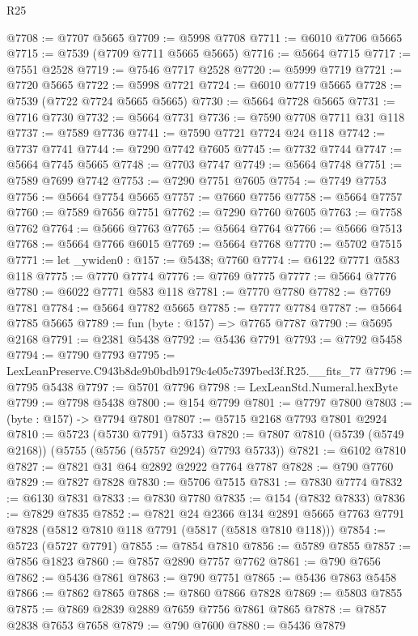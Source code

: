 \begin{lexlean}{R25}
\begin{coremodule}
@7708 := @7707 @5665
@7709 := @5998 @7708
@7711 := @6010 @7706 @5665
@7715 := @7539 (@7709 @7711 @5665 @5665)
@7716 := @5664 @7715
@7717 := @7551 @2528
@7719 := @7546 @7717 @2528
@7720 := @5999 @7719
@7721 := @7720 @5665
@7722 := @5998 @7721
@7724 := @6010 @7719 @5665
@7728 := @7539 (@7722 @7724 @5665 @5665)
@7730 := @5664 @7728 @5665
@7731 := @7716 @7730
@7732 := @5664 @7731
@7736 := @7590 @7708 @7711 @31 @118
@7737 := @7589 @7736
@7741 := @7590 @7721 @7724 @24 @118
@7742 := @7737 @7741
@7744 := @7290 @7742 @7605
@7745 := @7732 @7744
@7747 := @5664 @7745 @5665
@7748 := @7703 @7747
@7749 := @5664 @7748
@7751 := @7589 @7699 @7742
@7753 := @7290 @7751 @7605
@7754 := @7749 @7753
@7756 := @5664 @7754 @5665
@7757 := @7660 @7756
@7758 := @5664 @7757
@7760 := @7589 @7656 @7751
@7762 := @7290 @7760 @7605
@7763 := @7758 @7762
@7764 := @5666 @7763
@7765 := @5664 @7764
@7766 := @5666 @7513
@7768 := @5664 @7766 @6015
@7769 := @5664 @7768
@7770 := @5702 @7515
@7771 := let _ywiden0 : @157 := @5438; @7760
@7774 := @6122 @7771 @583 @118
@7775 := @7770 @7774
@7776 := @7769 @7775
@7777 := @5664 @7776
@7780 := @6022 @7771 @583 @118
@7781 := @7770 @7780
@7782 := @7769 @7781
@7784 := @5664 @7782 @5665
@7785 := @7777 @7784
@7787 := @5664 @7785 @5665
@7789 := fun (byte : @157) => @7765 @7787
@7790 := @5695 @2168
@7791 := @2381 @5438
@7792 := @5436 @7791
@7793 := @7792 @5458
@7794 := @7790 @7793
@7795 := LexLeanPreserve.C943b8de9b0bdb9179c4e05c7397bed3f.R25.__fits_77
@7796 := @7795 @5438
@7797 := @5701 @7796
@7798 := LexLeanStd.Numeral.hexByte
@7799 := @7798 @5438
@7800 := @154 @7799
@7801 := @7797 @7800
@7803 := (byte : @157) -> @7794 @7801
@7807 := @5715 @2168 @7793 @7801 @2924
@7810 := @5723 (@5730 @7791) @5733
@7820 := @7807 @7810 (@5739 (@5749 @2168)) (@5755 (@5756 (@5757 @2924) @7793 @5733))
@7821 := @6102 @7810
@7827 := @7821 @31 @64 @2892 @2922 @7764 @7787
@7828 := @790 @7760
@7829 := @7827 @7828
@7830 := @5706 @7515
@7831 := @7830 @7774
@7832 := @6130 @7831
@7833 := @7830 @7780
@7835 := @154 (@7832 @7833)
@7836 := @7829 @7835
@7852 := @7821
    @24
    @2366
    @134
    @2891
    @5665
    @7763
    @7791
    @7828
    (@5812 @7810 @118 @7791 (@5817 (@5818 @7810 @118)))
@7854 := @5723 (@5727 @7791)
@7855 := @7854 @7810
@7856 := @5789 @7855
@7857 := @7856 @1823
@7860 := @7857 @2890 @7757 @7762
@7861 := @790 @7656
@7862 := @5436 @7861
@7863 := @790 @7751
@7865 := @5436 @7863 @5458
@7866 := @7862 @7865
@7868 := @7860 @7866 @7828
@7869 := @5803 @7855
@7875 := @7869 @2839 @2889 @7659 @7756 @7861 @7865
@7878 := @7857 @2838 @7653 @7658
@7879 := @790 @7600
@7880 := @5436 @7879

\end{coremodule}
\end{lexlean}

